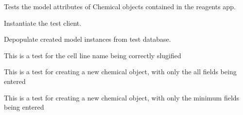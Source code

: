 \documentclass[letterpaper,10pt,english]{sphinxmanual}
\begin{document}

\begin{fulllineitems}
\label{api:experimentdb.reagents.tests.ChemicalModelTests}
Tests the model attributes of Chemical objects contained in the reagents app.

\begin{fulllineitems}
\label{api:experimentdb.reagents.tests.ChemicalModelTests.setUp}
Instantiate the test client.

\end{fulllineitems}


\begin{fulllineitems}
\label{api:experimentdb.reagents.tests.ChemicalModelTests.tearDown}
Depopulate created model instances from test database.

\end{fulllineitems}


\begin{fulllineitems}
\label{api:experimentdb.reagents.tests.ChemicalModelTests.test_chemical_slugify}
This is a test for the cell line name being correctly slugified

\end{fulllineitems}


\begin{fulllineitems}
\label{api:experimentdb.reagents.tests.ChemicalModelTests.test_create_chemical_all_fields}
This is a test for creating a new chemical object, with only the all fields being entered

\end{fulllineitems}


\begin{fulllineitems}
\label{api:experimentdb.reagents.tests.ChemicalModelTests.test_create_chemical_minimal}
This is a test for creating a new chemical object, with only the minimum fields being entered

\end{fulllineitems}


\end{fulllineitems}
\end{document}
